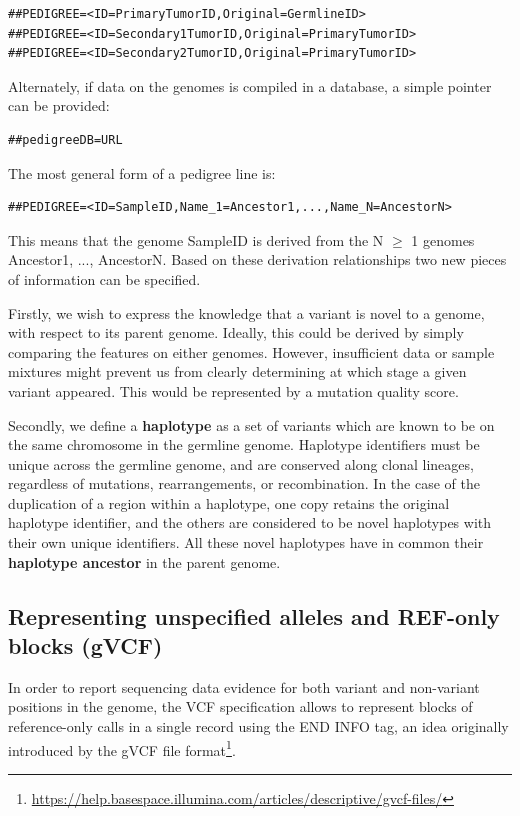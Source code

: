 \documentclass[8pt]{article}
\begin{document}
\begin{verbatim}
##PEDIGREE=<ID=PrimaryTumorID,Original=GermlineID>
##PEDIGREE=<ID=Secondary1TumorID,Original=PrimaryTumorID>
##PEDIGREE=<ID=Secondary2TumorID,Original=PrimaryTumorID>
\end{verbatim}

Alternately, if data on the genomes is compiled in a database, a simple pointer can be provided:

\begin{verbatim}
##pedigreeDB=URL
\end{verbatim}

\begin{samepage}
The most general form of a pedigree line is:

\begin{verbatim}
##PEDIGREE=<ID=SampleID,Name_1=Ancestor1,...,Name_N=AncestorN>
\end{verbatim}
\end{samepage}

This means that the genome SampleID is derived from the N $\ge$ 1 genomes Ancestor1, ..., AncestorN.
Based on these derivation relationships two new pieces of information can be specified.

Firstly, we wish to express the knowledge that a variant is novel to a genome, with respect to its parent genome.
Ideally, this could be derived by simply comparing the features on either genomes.
However, insufficient data or sample mixtures might prevent us from clearly determining at which stage a given variant appeared. This would be represented by a mutation quality score.

Secondly, we define a \textbf{haplotype} as a set of variants which are known to be on the same chromosome in the germline genome.
Haplotype identifiers must be unique across the germline genome, and are conserved along clonal lineages, regardless of mutations, rearrangements, or recombination.
In the case of the duplication of a region within a haplotype, one copy retains the original haplotype identifier, and the others are considered to be novel haplotypes with their own unique identifiers.
All these novel haplotypes have in common their \textbf{haplotype ancestor} in the parent genome.

\pagebreak
\subsection{Representing unspecified alleles and REF-only blocks (gVCF)}
\label{unspecified-allele}
In order to report sequencing data evidence for both variant and non-variant positions in the genome, the VCF specification allows to represent blocks of reference-only calls in a single record using the END INFO tag, an idea originally introduced by the gVCF file format\footnote{\url{https://help.basespace.illumina.com/articles/descriptive/gvcf-files/}}.
\end{document}
